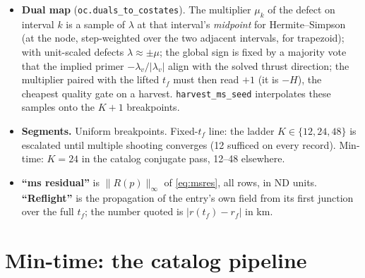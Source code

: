 \documentclass[11pt]{article}
\newcommand{\lv}{\lambda_v}\newcommand{\lr}{\lambda_r}\newcommand{\lm}{\lambda_m}
\newcommand{\tf}{t_f}\newcommand{\R}{\mathbb{R}}
\newcommand{\file}[1]{\texttt{#1}}
\begin{document}
\begin{itemize}
\item \textbf{Dual map} (\file{oc.duals\_to\_costates}). The multiplier $\mu_k$ of the defect on interval $k$ is a sample of $\lambda$ at that interval's \emph{midpoint} for Hermite--Simpson (at the node, step-weighted over the two adjacent intervals, for trapezoid); with unit-scaled defects $\lambda\approx\pm\mu$; the global sign is fixed by a majority vote that the implied primer $-\lv/|\lv|$ align with the solved thrust direction; the multiplier paired with the lifted $\tf$ must then read $+1$ (it is $-H$), the cheapest quality gate on a harvest. \file{harvest\_ms\_seed} interpolates these samples onto the $K{+}1$ breakpoints.
\item \textbf{Segments.} Uniform breakpoints. Fixed-$\tf$ line: the ladder $K\in\{12,24,48\}$ is escalated until multiple shooting converges (12 sufficed on every record). Min-time: $K=24$ in the catalog conjugate pass, 12--48 elsewhere.
\item \textbf{``ms residual''} is $\|R(p)\|_\infty$ of \eqref{eq:msres}, all rows, in ND units. \textbf{``Reflight''} is the propagation of the entry's own field from its first junction over the full $\tf$; the number quoted is $|r(\tf)-r_f|$ in km.
\end{itemize}

\section{Min-time: the catalog pipeline}
\end{document}
